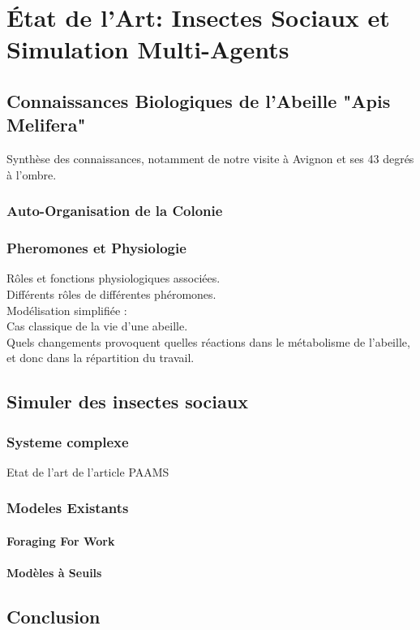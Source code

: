 \documentclass[11pt,a4paper]{report}
\begin{document}
\chapter{État de l'Art: Insectes Sociaux et Simulation Multi-Agents}
	\section{Connaissances Biologiques de l'Abeille "Apis Melifera"}
			Synthèse des connaissances, notamment de notre visite à Avignon et ses 43 degrés à l'ombre.\\
		\subsection{Auto-Organisation de la Colonie}
		\subsection{Pheromones et Physiologie}
		
			Rôles et fonctions physiologiques associées.\\
			Différents rôles de différentes phéromones.\\
			Modélisation simplifiée : \\
			Cas classique de la vie d'une abeille.\\
			Quels changements provoquent quelles réactions dans le métabolisme de l'abeille, et donc dans la répartition du travail.
	\section{Simuler des insectes sociaux}
		\subsection{Systeme complexe}
	Etat de l'art de l'article PAAMS
		\subsection{Modeles Existants}
			\subsubsection{Foraging For Work}
			\subsubsection{Modèles à Seuils}
			
	\section*{Conclusion}
	
\end{document}
